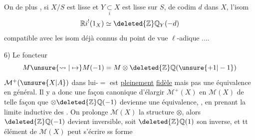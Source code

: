 On   de plus ,  si $X/S$ est %
lisse et $Y\underset{i}{\subset}X$ est lisse sur $S$, de codim %
$d$ dans $X$, l'isom %
\[
\mathbb R i^!(1_X)\simeq\deleted{\mathbb Z}\mathbb Q_Y(-d) %
\]
compatible avec les isom déjà connus %
du point de vue $\ell$-adique .... %

6)  %
Le foncteur %
\[
M\unsure{\leadsto|\mapsto}M(-1)=M\otimes\deleted{\mathbb Z}\mathbb Q(\unsure{+1|-1}) %
\]
 $\mathcal M^+(\unsure{X|A})$ dans lui-$=$ est \uline{pleinement} \uline{fidèle} %
mais pas une équivalence en général. %
Il y a donc une façon canonique %
d'élargir $\mathcal M^+(X)$ en  $\mathcal M(X)$ de telle façon %
que  $\otimes\deleted{\mathbb Z}\mathbb Q(-1)$ devienne une équivalence, %
, en prenant la limite inductive %
des %
. On prolonge %
$\mathcal M(X)$ la structure $\otimes$, alors $\deleted{\mathbb Z}\mathbb Q(-1)$ %
devient inversible, soit $\deleted{\mathbb Z}\mathbb Q(1)$ son inverse, et %
tt élément de $\mathcal M(X)$ peut s'écrire ss forme %

